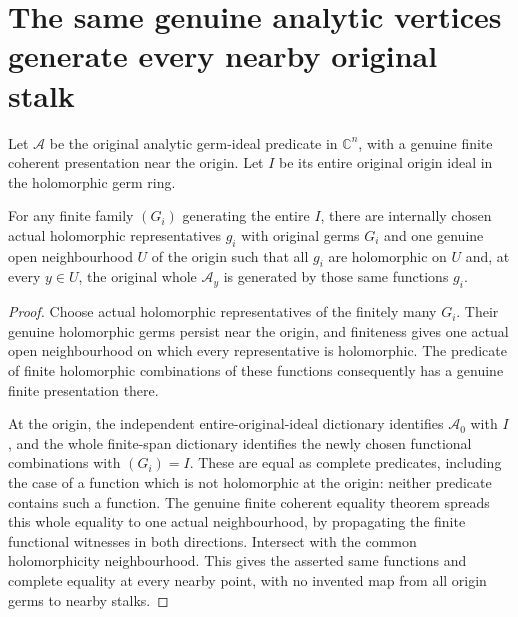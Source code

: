 \section{The same genuine analytic vertices generate every nearby original stalk}

Let $\mathcal A$ be the original analytic germ-ideal predicate in
$\mathbb C^n$, with a genuine finite coherent presentation near the origin.
Let $I$ be its entire original origin ideal in the holomorphic germ ring.

\begin{lemma}
\label{hir:actual-original-origin-basis-nearby-generators}
\leanok
For any finite family $(G_i)$ generating the entire $I$, there are internally
chosen actual holomorphic representatives $g_i$ with original germs $G_i$
and one genuine open neighbourhood $U$ of the origin such that all $g_i$
are holomorphic on $U$ and, at every $y\in U$, the original whole
$\mathcal A_y$ is generated by those same functions $g_i$.
\end{lemma}
\begin{proof}
Choose actual holomorphic representatives of the finitely many $G_i$.
Their genuine holomorphic germs persist near the origin, and finiteness
gives one actual open neighbourhood on which every representative is
holomorphic. The predicate of finite holomorphic combinations of these
functions consequently has a genuine finite presentation there.

At the origin, the independent entire-original-ideal dictionary identifies
$\mathcal A_0$ with $I$, and the whole finite-span dictionary identifies
the newly chosen functional combinations with $(G_i)=I$. These are equal
as complete predicates, including the case of a function which is not
holomorphic at the origin: neither predicate contains such a function.
The genuine finite coherent equality theorem spreads this whole equality
to one actual neighbourhood, by propagating the finite functional witnesses
in both directions. Intersect with the common holomorphicity neighbourhood.
This gives the asserted same functions and complete equality at every
nearby point, with no invented map from all origin germs to nearby stalks.
\end{proof}


